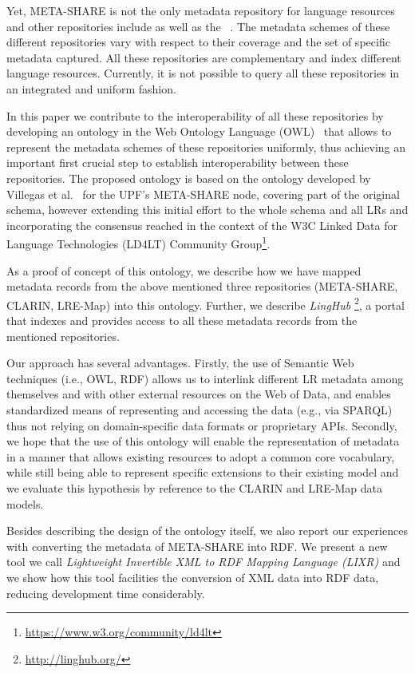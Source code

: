 \documentclass{llncs}
\begin{document}
Yet, META-SHARE is not the only metadata repository for language resources and other repositories include \cite[CLARIN]{broeder2010data} as well as the 
~\cite[LRE-Map]{calzolari2012lre}. The metadata schemes of these different repositories vary with respect to their coverage and the set of specific metadata captured. 
All these repositories are complementary and index different language resources. Currently, it is not possible to query all these repositories in an integrated and uniform fashion. 

In this paper we contribute to the interoperability of all these repositories by developing an ontology in the Web Ontology Language (OWL)~\cite{motik2012owl} that allows to represent the metadata schemes of these repositories uniformly, thus achieving an important first crucial step to establish interoperability between these repositories. The proposed ontology is based on the ontology developed by Villegas et al.~\cite{Villegas2014} for the UPF's META-SHARE node, covering part of the original schema, however extending this initial effort to the whole schema and all LRs and incorporating the consensus 
reached in the context of the W3C Linked Data for Language Technologies (LD4LT) Community Group\footnote{\url{https://www.w3.org/community/ld4lt}}.

As a proof of concept of this ontology, we describe how we have mapped metadata records from the above mentioned three repositories (META-SHARE, CLARIN, LRE-Map) into this ontology. Further, we describe \emph{LingHub} \footnote{\url{http://linghub.org/}}, a portal that indexes and provides access to all these metadata records from the mentioned repositories. 

Our approach has several advantages. Firstly, the use of Semantic Web techniques
(i.e., OWL, RDF) allows us to
interlink different LR metadata among themselves and with other external resources on the Web of Data, and enables standardized means of representing and accessing the data (e.g., via SPARQL) thus not relying on domain-specific data formats or proprietary APIs. Secondly, we hope that the use of this ontology will enable the representation of metadata in a manner that allows existing resources to adopt a
common core vocabulary, while still being able to represent specific extensions
to their existing model and we evaluate this hypothesis by reference to the
CLARIN and LRE-Map data models.

Besides describing the design of the ontology itself, we also report our experiences with converting the metadata of META-SHARE into RDF.
We present a new tool we call \emph{Lightweight Invertible XML to RDF Mapping
Language (LIXR)} and we show how this tool facilities the conversion of XML data into RDF data, reducing development time considerably.
\end{document}
